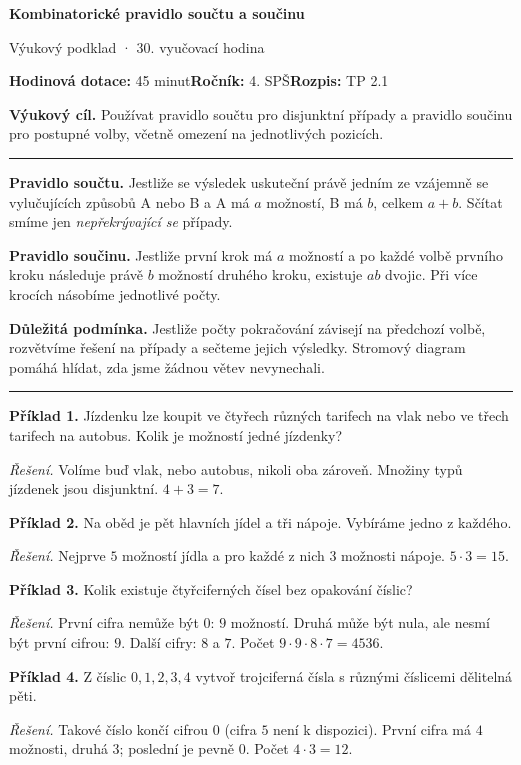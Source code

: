 \documentclass[11pt,a4paper]{article}
\newcommand{\sect}[1]{\par\vspace{2mm}{\Large\sffamily\bfseries\color{deep} #1}\par\vspace{-0.5mm}\noindent\color{teal}\rule{\linewidth}{0.7pt}\color{black}\vspace{1mm}}
\begin{document}
{\Huge\sffamily\bfseries\color{deep} Kombinatorické pravidlo součtu a součinu}\par
{\sffamily\large\color{teal} Výukový podklad · 30. vyučovací hodina}\par
\textbf{Hodinová dotace:} 45 minut\quad \textbf{Ročník:} 4. SPŠ\quad \textbf{Rozpis:} TP 2.1\par
\begin{tcolorbox}[theobox]\textbf{Výukový cíl.} Používat pravidlo součtu pro disjunktní případy a pravidlo součinu pro postupné volby, včetně omezení na jednotlivých pozicích.\end{tcolorbox}
\sect{Teorie a vysvětlení}
\textbf{Pravidlo součtu.} Jestliže se výsledek uskuteční právě jedním ze vzájemně se vylučujících způsobů A nebo B a A má \(a\) možností, B má \(b\), celkem \(a+b\). Sčítat smíme jen \emph{nepřekrývající se} případy.\par
\textbf{Pravidlo součinu.} Jestliže první krok má \(a\) možností a po každé volbě prvního kroku následuje právě \(b\) možností druhého kroku, existuje \(ab\) dvojic. Při více krocích násobíme jednotlivé počty.\par
\textbf{Důležitá podmínka.} Jestliže počty pokračování závisejí na předchozí volbě, rozvětvíme řešení na případy a sečteme jejich výsledky. Stromový diagram pomáhá hlídat, zda jsme žádnou větev nevynechali.
\sect{Řešené příklady}
\textbf{Příklad 1.} Jízdenku lze koupit ve čtyřech různých tarifech na vlak nebo ve třech tarifech na autobus. Kolik je možností jedné jízdenky?\par
\textit{Řešení.} Volíme buď vlak, nebo autobus, nikoli oba zároveň. Množiny typů jízdenek jsou disjunktní. \(4+3=7\).\par\smallskip
\textbf{Příklad 2.} Na oběd je pět hlavních jídel a tři nápoje. Vybíráme jedno z každého.\par
\textit{Řešení.} Nejprve \(5\) možností jídla a pro každé z nich \(3\) možnosti nápoje. \(5\cdot3=15\).\par\smallskip
\textbf{Příklad 3.} Kolik existuje čtyřciferných čísel bez opakování číslic?\par
\textit{Řešení.} První cifra nemůže být \(0\): \(9\) možností. Druhá může být nula, ale nesmí být první cifrou: \(9\). Další cifry: \(8\) a \(7\). Počet \(9\cdot9\cdot8\cdot7=4536\).\par\smallskip
\textbf{Příklad 4.} Z číslic \(0,1,2,3,4\) vytvoř trojciferná čísla s různými číslicemi dělitelná pěti.\par
\textit{Řešení.} Takové číslo končí cifrou \(0\) (cifra \(5\) není k dispozici). První cifra má \(4\) možnosti, druhá \(3\); poslední je pevně \(0\). Počet \(4\cdot3=12\).\par\smallskip
\end{document}
